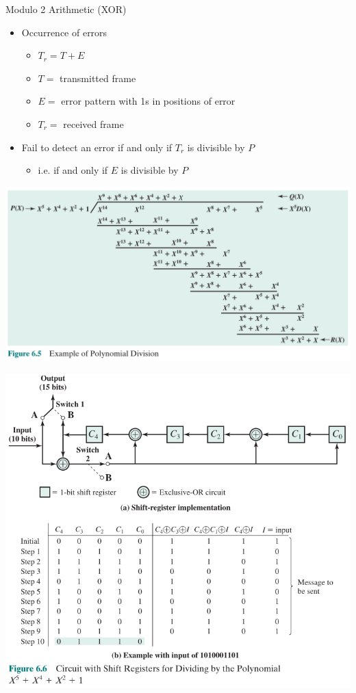 \documentclass[pdflatex,compress]{beamer}
\begin{document}
\begin{frame}{Modulo 2 Arithmetic (XOR)}
	\begin{itemize}
		\item Occurrence of errors
		\begin{itemize}
			\item $ T_r = T + E $
			\item $ T = $ transmitted frame
			\item $ E = $ error pattern with 1s in positions of error
			\item $ T_r = $ received frame
		\end{itemize}
		\item Fail to detect an error if and only if $ T_r $ is divisible by $ P $
		\begin{itemize}
			\item i.e. if and only if $ E $ is divisible by $ P $
		\end{itemize}
	\end{itemize}
\end{frame}

\begin{frame}
	\begin{center}
		\includegraphics[width=\linewidth]{img/img05}
	\end{center}
\end{frame}

\begin{frame}
	\begin{center}
		\includegraphics[width=0.7\linewidth]{img/img06}
	\end{center}
\end{frame}
\end{document}
